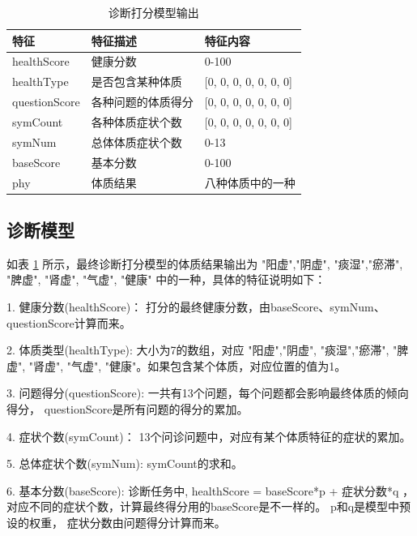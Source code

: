 \begin{table}[]
    \begin{center}
        \begin{tabular}{lll}
            \toprule
            特征 & 特征描述 & 特征内容 \\ 
            \midrule
            healthScore & 健康分数 & 0-100 \\
            healthType & 是否包含某种体质 & {[}0, 0, 0, 0, 0, 0, 0{]} \\ 
            questionScore & 各种问题的体质得分 & {[}0, 0, 0, 0, 0, 0, 0{]} \\
            symCount & 各种体质症状个数 & {[}0, 0, 0, 0, 0, 0, 0{]} \\
            symNum & 总体体质症状个数 & 0-13 \\
            baseScore & 基本分数 & 0-100 \\
            phy & 体质结果 & 八种体质中的一种\\
            \bottomrule
        \end{tabular}
    \end{center}
    \caption{诊断打分模型输出}
    \label{tab:diag-feature}
\end{table}

\subsection{诊断模型}

如表 \ref{tab:diag-feature} 所示，最终诊断打分模型的体质结果输出为 "阳虚","阴虚", "痰湿","瘀滞", "脾虚", "肾虚", "气虚", "健康" 中的一种，具体的特征说明如下：

1. 健康分数(healthScore)： 打分的最终健康分数，由baseScore、symNum、questionScore计算而来。

2. 体质类型(healthType): 大小为7的数组，对应 "阳虚","阴虚", "痰湿","瘀滞", "脾虚", "肾虚", "气虚", "健康"。如果包含某个体质，对应位置的值为1。

3. 问题得分(questionScore): 一共有13个问题，每个问题都会影响最终体质的倾向得分， questionScore是所有问题的得分的累加。

4. 症状个数(symCount)： 13个问诊问题中，对应有某个体质特征的症状的累加。

5. 总体症状个数(symNum): symCount的求和。

6. 基本分数(baseScore): 诊断任务中, healthScore = baseScore*p + 症状分数*q ，对应不同的症状个数，计算最终得分用的baseScore是不一样的。 
p和q是模型中预设的权重， 症状分数由问题得分计算而来。

